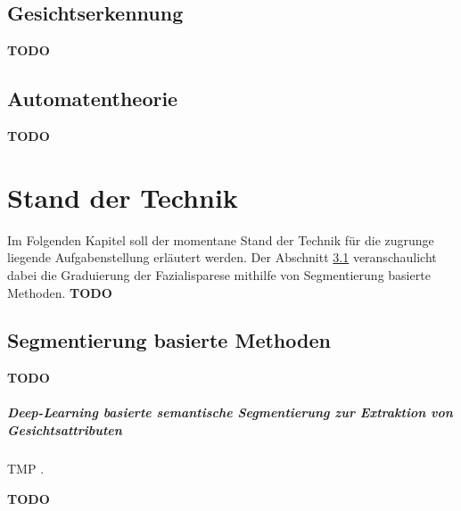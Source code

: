 \section{Gesichtserkennung}\label{facedetection}
\textbf{TODO}

\section{Automatentheorie}\label{automatatheory}
\textbf{TODO}





\chapter{Stand der Technik}\label{std}

Im Folgenden Kapitel soll der momentane  Stand der Technik für die zugrunge liegende Aufgabenstellung erläutert werden. Der Abschnitt \ref{segmentation} veranschaulicht dabei die Graduierung der Fazialisparese mithilfe von Segmentierung basierte Methoden.
\textbf{TODO}

\section{Segmentierung basierte Methoden}\label{segmentation}
\textbf{TODO}


\paragraph{Deep-Learning basierte semantische Segmentierung zur Extraktion von Gesichtsattributen}
TMP \cite{detection_fp2}.

\textbf{TODO}
